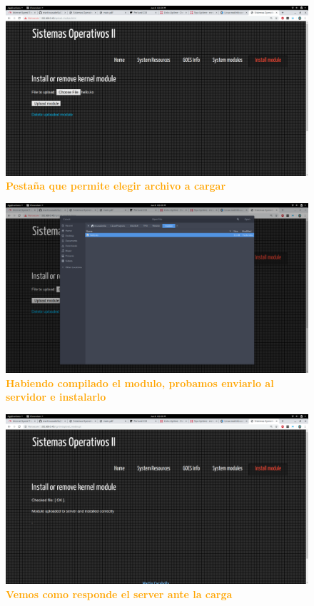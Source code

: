 \documentclass{article}
\begin{document}
\begin{figure}[H]
    \centering
      \includegraphics[width=1.0\textwidth]{figures/11.png}
       \centering
\caption{\textbf{\textcolor{Orange}{Pestaña que permite elegir archivo a cargar}}}
         \end{figure}


\begin{figure}[H]
    \centering
      \includegraphics[width=1.0\textwidth]{figures/10.png}
       \centering
       \caption{\textbf{\textcolor{Orange}{Habiendo compilado el modulo, probamos enviarlo al servidor e instalarlo}}}
    \end{figure}




\begin{figure}[H]
    \centering
      \includegraphics[width=1.0\textwidth]{figures/13.png}
       \centering
       \caption{\textbf{\textcolor{Orange}{Vemos como responde el server ante la carga}}}
         \end{figure}
\end{document}
